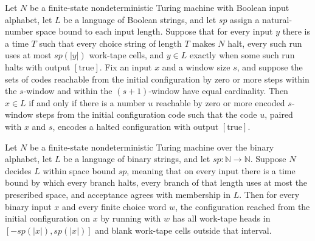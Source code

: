 \begin{theorem}
\label{Complexity.ExpBFS.mem_iff_of_card_eq}
\leanok
{}
Let $N$ be a finite-state nondeterministic Turing machine with Boolean input alphabet,
let $L$ be a language of Boolean strings, and let $sp$ assign a natural-number space
bound to each input length. Suppose that for every input $y$ there is a time $T$ such
that every choice string of length $T$ makes $N$ halt, every such run uses at most
$sp(|y|)$ work-tape cells, and $y\in L$ exactly when some such run halts with output
$[\mathrm{true}]$. Fix an input $x$ and a window size $s$, and suppose the sets of codes
reachable from the initial configuration by zero or more steps within the $s$-window and
within the $(s+1)$-window have equal cardinality. Then $x\in L$ if and only if there is
a number $u$ reachable by zero or more encoded $s$-window steps from the initial
configuration code such that the code $u$, paired with $x$ and $s$, encodes a halted
configuration with output $[\mathrm{true}]$.
\end{theorem}

\begin{lemma}
\label{Complexity.ExpBFS.inWin_runWith_of_decides}
\leanok
{}
Let $N$ be a finite-state nondeterministic Turing machine over the binary alphabet, let
$L$ be a language of binary strings, and let $sp:\mathbb{N}\to\mathbb{N}$. Suppose $N$
decides $L$ within space bound $sp$, meaning that on every input there is a time bound
by which every branch halts, every branch of that length uses at most the prescribed
space, and acceptance agrees with membership in $L$. Then for every binary input $x$ and
every finite choice word $w$, the configuration reached from the initial configuration
on $x$ by running with $w$ has all work-tape heads in $[-sp(|x|),sp(|x|)]$ and blank
work-tape cells outside that interval.
\end{lemma}

